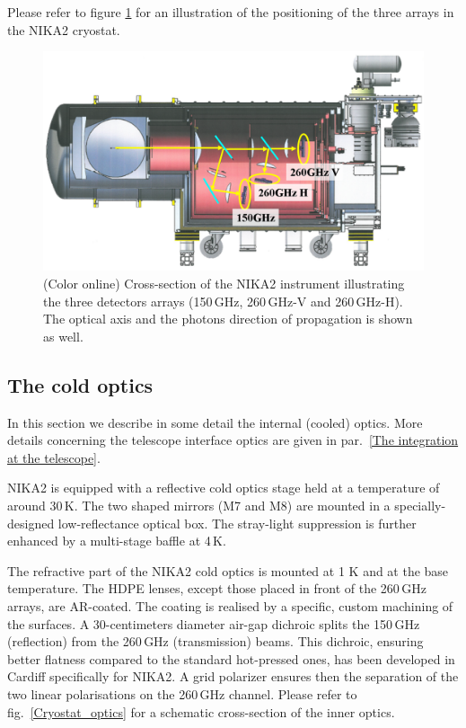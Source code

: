 \documentclass[]{aa} %
\begin{document}
Please refer to figure \ref{Cryostat} for an illustration of the positioning of the three arrays in the NIKA2 cryostat.
 
\begin{figure}[h]
   \centering
   \includegraphics[width=.95\linewidth]{Fig1_cryo.png}
      \caption{(Color online) Cross-section of the NIKA2 instrument illustrating the three detectors arrays (150\,GHz, 260\,GHz-V and 260\,GHz-H). The optical axis and the photons direction of propagation is shown as well.}
         \label{Cryostat}
\end{figure}


 \subsection{The cold optics}

In this section we describe in some detail the internal (cooled) optics. More details concerning the telescope interface optics are given in par.~\ref{The integration at the telescope}.

NIKA2 is equipped with a reflective cold optics stage held at a temperature of around 30\,K. The two shaped mirrors (M7 and M8) are mounted in a specially-designed low-reflectance optical box. The stray-light suppression is further enhanced by a multi-stage baffle at 4\,K.

The refractive part of the NIKA2 cold optics is mounted at 1 K and at the base temperature. The HDPE lenses, except those placed in front of the 260\,GHz arrays, are AR-coated. The coating is realised by a specific, custom machining of the surfaces. A 30-centimeters diameter air-gap dichroic splits the 150\,GHz (reflection) from the 260\,GHz (transmission) beams. This dichroic, ensuring better flatness compared to the standard hot-pressed ones, has been developed in Cardiff specifically for NIKA2. A grid polarizer ensures then the separation of the two linear polarisations on the 260\,GHz channel. Please refer to fig.~\ref{Cryostat_optics} for a schematic cross-section of the inner optics.
\end{document}
